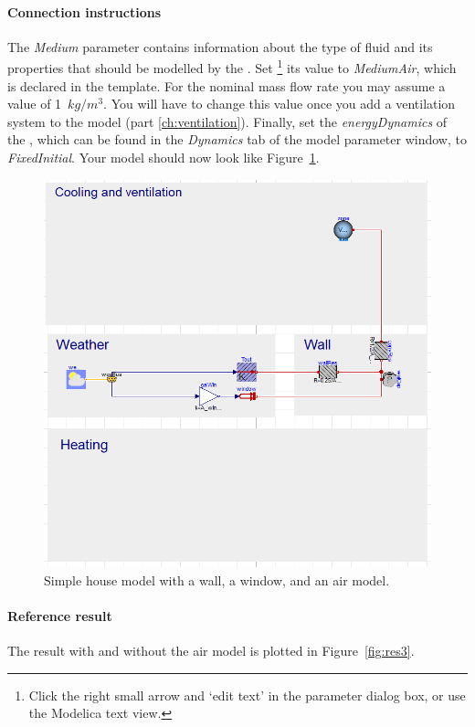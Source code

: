 \documentclass[10pt,a4paper]{article}
\begin{document}
\paragraph{Connection instructions}
The  \textit{Medium} parameter contains
information about the type of fluid and its properties
that should be modelled by the .
Set
\footnote{Click the right small arrow and `edit text' in the parameter dialog box, or use the Modelica text view.}
 its value to \textit{MediumAir}, which is declared in the template. For the nominal mass flow rate you may assume a value of 1~$kg/m^3$. You will have to change this value once you add a ventilation system to the model (part \ref{ch:ventilation}). Finally, set the \textit{energyDynamics} of the , which can be found in the \textit{Dynamics} tab of the model parameter window, to \textit{FixedInitial}. Your model should now look like Figure~\ref{fig:airModel}.
 
 \begin{figure}[h!]
\centering
\includegraphics[scale=0.35]{airModel.png}
\caption{Simple house model with a wall, a window, and an air model.}
\label{fig:airModel}
\end{figure} 

\paragraph{Reference result}
The result with and without the air model
is plotted in Figure~\ref{fig:res3}.
\end{document}
